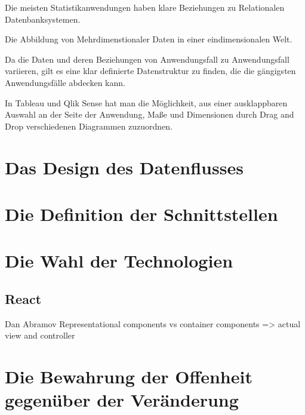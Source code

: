Die meisten Statistikanwendungen haben klare Beziehungen zu Relationalen Datenbanksystemen. 

Die Abbildung von Mehrdimenstionaler Daten in einer eindimensionalen Welt.




Da die Daten und deren Beziehungen von Anwendungsfall zu Anwendungsfall
variieren, gilt es eine klar definierte Datenstruktur zu finden, die
die gängigsten Anwendungsfälle abdecken kann. 




In Tableau und Qlik Sense hat man die Möglichkeit, aus einer ausklappbaren Auswahl an der Seite der
Anwendung, Maße und Dimensionen durch Drag and Drop verschiedenen Diagrammen zuzuordnen. 

\section{Das Design des Datenflusses}
\label{sec:das-design-des-datenflusses}

\section{Die Definition der Schnittstellen}
\label{sec:die-definition-der-schnittstellen}

\section{Die Wahl der Technologien}

\subsection{React}
Dan Abramov Representational components vs container components => actual view and controller


\section{Die Bewahrung der Offenheit gegenüber der Veränderung}
\label{sec:die-bewahrung-der-offenheit-gegenueber-der-veraenderung}

